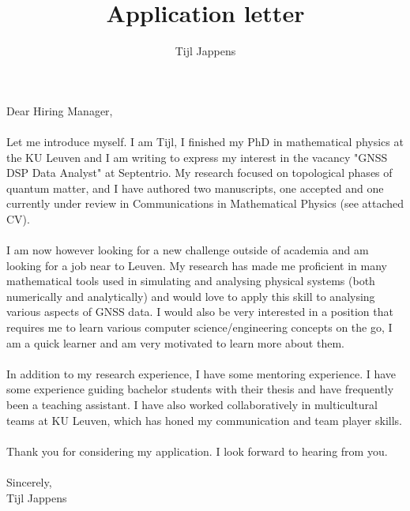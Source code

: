 \documentclass[11pt]{article}
\title{Application letter}
\author{Tijl Jappens}
\begin{document}
\maketitle
Dear Hiring Manager,\\\\
Let me introduce myself. I am Tijl, I finished my PhD in mathematical physics at the KU Leuven and I am writing to express my interest in the vacancy "GNSS DSP Data Analyst" at Septentrio. My research focused on topological phases of quantum matter, and I have authored two manuscripts, one accepted and one currently under review in Communications in Mathematical Physics (see attached CV).\\\\
I am now however looking for a new challenge outside of academia and am looking for a job near to Leuven. My research has made me proficient in many mathematical tools used in simulating and analysing physical systems (both numerically and analytically) and would love to apply this skill to analysing various aspects of GNSS data. I would also be very interested in a position that requires me to learn various computer science/engineering concepts on the go, I am a quick learner and am very motivated to learn more about them.\\\\
In addition to my research experience, I have some mentoring experience. I have some experience guiding bachelor students with their thesis and have frequently been a teaching assistant. I have also worked collaboratively in multicultural teams at KU Leuven, which has honed my communication and team player skills.
\\\\
Thank you for considering my application. I look forward to hearing from you.\\\\
Sincerely,\\
Tijl Jappens
\end{document}
